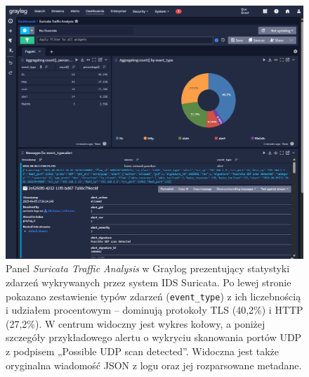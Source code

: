 \documentclass[
    left=2.5cm,         %
    right=2.5cm,        %
    top=2.5cm,          %
    bottom=3cm,         %
    bindingoffset=6mm,  %
    nohyphenation=true %
]{eiti/eiti-thesis} %
\begin{document}
\newpage
\begin{figure}[H]
    \centering
    \includegraphics[width=\textwidth]{img/graylog_alerts.png}
    \caption{Panel \textit{Suricata Traffic Analysis} w Graylog prezentujący statystyki zdarzeń wykrywanych przez system IDS Suricata. Po lewej stronie pokazano zestawienie typów zdarzeń (\texttt{event\_type}) z ich liczebnością i udziałem procentowym – dominują protokoły TLS (40,2\%) i HTTP (27,2\%). W centrum widoczny jest wykres kołowy, a poniżej szczegóły przykładowego alertu o wykryciu skanowania portów UDP z podpisem „Possible UDP scan detected”. Widoczna jest także oryginalna wiadomość JSON z logu oraz jej rozparsowane metadane.}
    \label{fig:graylog-suricata-dashboard}
\end{figure}
\end{document}
